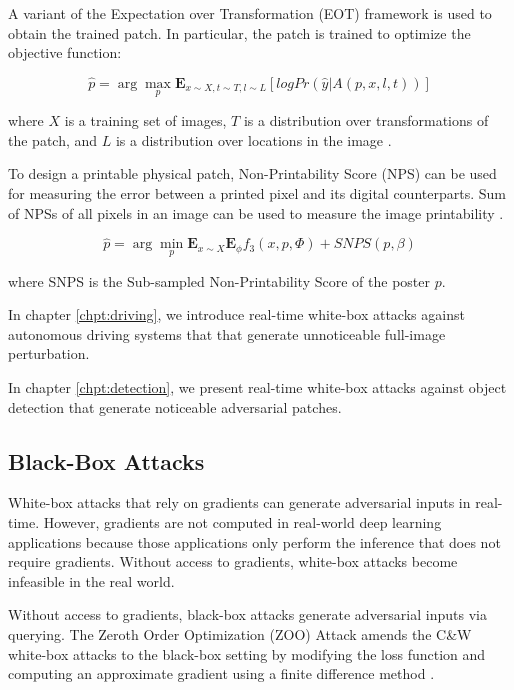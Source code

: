 A variant of the Expectation over Transformation (EOT) framework \cite{athalye2018synthesizing} is used to obtain the trained patch. In particular, the patch is trained to optimize the objective function:

$$\hat{p} = \arg \underset{p}{\max}\mathbf{E}_{x \sim X, t \sim T,l \sim L}[logPr(\hat{y}|A(p,x,l,t))]$$

where $X$ is a training set of images, $T$ is a distribution over transformations of the patch, and $L$ is a distribution over locations in the image \cite{brown2018adversarial}.

To design a printable physical patch, Non-Printability Score (NPS) can be used for measuring the error between a printed pixel and its digital counterparts. Sum of NPSs of all pixels in an image can be used to measure the image printability \cite{wang2021daedalus}.

$$\hat{p} = \arg \underset{p}{\min}\mathbf{E}_{x \sim X}\mathbf{E}_\phi f_3(x, p, \Phi) + SNPS(p, \beta)$$

where SNPS is the Sub-sampled Non-Printability Score of the poster $p$.

In chapter \ref{chpt:driving}, we introduce real-time white-box attacks against autonomous driving systems that that generate unnoticeable full-image perturbation.

In chapter \ref{chpt:detection}, we present real-time white-box attacks against object detection that generate noticeable adversarial patches.


\subsection{Black-Box Attacks}
\label{sec:blackbox_attack}

White-box attacks that rely on gradients can generate adversarial inputs in real-time. However, gradients are not computed in real-world deep learning applications because those applications only perform the inference that does not require gradients. Without access to gradients, white-box attacks become infeasible in the real world.

Without access to gradients, black-box attacks generate adversarial inputs via querying. The Zeroth Order Optimization (ZOO) Attack amends the C\&W white-box attacks to the black-box setting by modifying the loss function and computing an approximate gradient using a finite difference method \cite{Chen_2017}.


